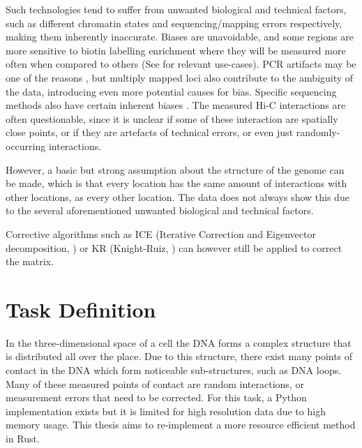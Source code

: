 Such technologies tend to suffer from unwanted biological and technical
factors, such as different chromatin states \cite{pmid19693276} and
sequencing/mapping errors \cite{pmid21646344} respectively, making them
inherently inaccurate. Biases are unavoidable, and some regions are more
sensitive to biotin labelling enrichment where they will be measured more often
when compared to others (See  for relevant use-cases). PCR
artifacts may be one of the reasons \cite{wingett2015hicup}, but multiply
mapped loci also contribute to the ambiguity of the data, introducing even more
potential causes for bias. Specific sequencing methods also have certain
inherent biases \cite{aird2011analyzing}. The measured Hi-C interactions are
often questionable, since it is unclear if some of these interaction are
spatially close points, or if they are artefacts of technical errors, or even
just randomly-occurring interactions.

However, a basic but strong assumption about the structure of the genome can be
made, which is that every location has the same amount of interactions with
other locations, as every other location. The data does not always show this
due to the several aforementioned unwanted biological and technical factors.

Corrective algorithms such as ICE \cite{imakaev2012iterative} (Iterative
Correction and Eigenvector decomposition, ) or KR
\cite{knight2013fast} (Knight-Ruiz, ) can however still be
applied to correct the matrix.


\newpage
\section{Task Definition}\label{sec:task}


In the three-dimensional space of a cell the DNA forms a complex structure that is
distributed all over the place. Due to this structure, there exist many points of contact
in the DNA which form noticeable sub-structures, such as DNA loops. Many
of these measured points of contact are random interactions, or measurement errors that
need to be corrected. For this task, a Python implementation exists but it is
limited for high resolution data due to high memory usage. This thesis aims to
re-implement a more resource efficient method in Rust.

